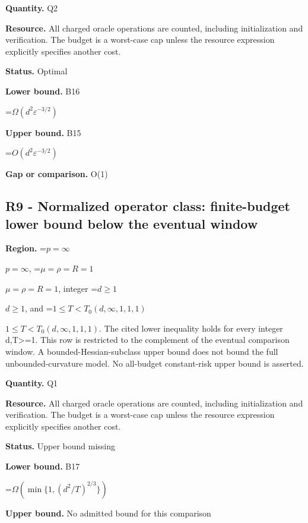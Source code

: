 \documentclass[10pt,a4paper]{article}
\newcommand{\AtlasMath}[1]{\par\begingroup\centering\setbox0=\hbox{$\displaystyle #1$}\ifdim\wd0>1.4\linewidth\typeout{ATLAS WIDE FORMULA: \the\wd0}\fi\ifdim\wd0>\linewidth\resizebox{\linewidth}{!}{\box0}\else\box0\fi\par\endgroup}
\newcommand{\AtlasInlineMath}[1]{\begingroup\setbox0=\hbox{$#1$}\ifdim\wd0>.4\linewidth\endgroup\AtlasMath{#1}\else\endgroup$#1$\fi}
\begin{document}
\textbf{Quantity.} Q2



\textbf{Resource.} All charged oracle operations are counted, including initialization and verification. The budget is a worst-case cap unless the resource expression explicitly specifies another cost.



\textbf{Status.} Optimal



\textbf{Lower bound.} B16



\AtlasMath{\Omega(d^2\varepsilon^{-3/2})}


\textbf{Upper bound.} B15



\AtlasMath{O(d^2\varepsilon^{-3/2})}


\textbf{Gap or comparison.} O(1)



\subsection{R9 - Normalized operator class: finite-budget lower bound below the eventual window}


\textbf{Region.} \AtlasInlineMath{p=\infty}, \AtlasInlineMath{\mu=\rho=R=1}, integer \AtlasInlineMath{d\ge1}, and \AtlasInlineMath{1\le T<T_0(d,\infty,1,1,1)}. The cited lower inequality holds for every integer d,T>=1. This row is restricted to the complement of the eventual comparison window. A bounded-Hessian-subclass upper bound does not bound the full unbounded-curvature model. No all-budget constant-risk upper bound is asserted.



\textbf{Quantity.} Q1



\textbf{Resource.} All charged oracle operations are counted, including initialization and verification. The budget is a worst-case cap unless the resource expression explicitly specifies another cost.



\textbf{Status.} Upper bound missing



\textbf{Lower bound.} B17



\AtlasMath{\Omega(\min\{1,(d^2/T)^{2/3}\})}


\textbf{Upper bound.} No admitted bound for this comparison
\end{document}
